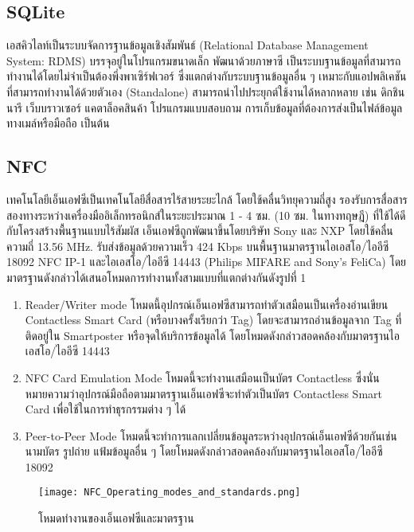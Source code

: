 \documentclass[a4paper]{article}
\begin{document}
\subsection{SQLite}
เอสคิวไลท์เป็นระบบจัดการฐานข้อมูลเชิงสัมพันธ์ (Relational Database Management System: RDMS) บรรจุอยู่ในโปรแกรมขนาดเล็ก พัฒนาด้วยภาษาซี เป็นระบบฐานข้อมูลที่สามารถทำงานได้โดยไม่จำเป็นต้องพึ่งพาเซิร์ฟเวอร์ ซึ่งแตกต่างกับระบบฐานข้อมูลอื่น ๆ เหมาะกับแอปพลิเคชันที่สามารถทำงานได้ด้วยตัวเอง (Standalone) สามารถนำไปประยุกต์ใช้งานได้หลากหลาย เช่น ดิกชินนารี เว็บบราวเซอร์ แคตาล็อคสินค้า โปรแกรมแบบสอบถาม การเก็บข้อมูลที่ต้องการส่งเป็นไฟล์ข้อมูลทางเมล์หรือมือถือ เป็นต้น

\subsection{NFC}
เทคโนโลยีเอ็นเอฟซีเป็นเทคโนโลยีสื่อสารไร้สายระยะไกล้ โดยใช้คลื่นวิทยุความถี่สูง รองรับการสื่อสารสองทางระหว่างเครื่องมืออิเล็กทรอนิกส์ในระยะประมาณ 1 - 4 ซม. (10 ซม. ในทางทฤษฎี) ที่ใช้ได้ดีกับโครงสร้างพื้นฐานแบบไร้สัมผัส เอ็นเอฟซีถูกพัฒนาขึ้นโดยบริษัท Sony และ NXP โดยใช้คลื่นความถี่ 13.56 MHz. รับส่งข้อมูลด้วยความเร็ว 424 Kbps บนพื้นฐานมาตรฐานไอเอสโอ/ไออีซี 18092 NFC IP-1 และไอเอสโอ/ไออีซี 14443 (Philips MIFARE and Sony’s FeliCa) โดยมาตรฐานดังกล่าวได้เสนอโหมดการทำงานทั้งสามแบบที่แตกต่างกันดังรูปที่ 1 

\begin{enumerate}
  \item Reader/Writer mode โหมดนี้อุปกรณ์เอ็นเอฟซีสามารถทำตัวเสมือนเป็นเครื่องอ่านเขียน Contactless Smart Card (หรือบางครั้งเรียกว่า Tag) โดยจะสามารถอ่านข้อมูลจาก Tag ที่ติดอยู่ใน Smartposter หรือจุดให้บริการข้อมูลได้ โดยโหมดดังกล่าวสอดคล้องกับมาตรฐานไอเอสโอ/ไออีซี 14443
  \item  NFC Card Emulation Mode โหมดนี้จะทำงานเสมือนเป็นบัตร Contactless ซึ่งนั่นหมายความว่าอุปกรณ์มือถือตามมาตรฐานเอ็นเอฟซีจะทำตัวเป็นบัตร Contactless Smart Card เพื่อใช้ในการทำธุรกรรมต่าง ๆ ได้
  \item Peer-to-Peer Mode โหมดนี้จะทำการแลกเปลี่ยนข้อมูลระหว่างอุปกรณ์เอ็นเอฟซีด้วยกันเช่นนามบัตร รูปถ่าย แฟ้มข้อมูลอื่น ๆ โดยโหมดดังกล่าวสอดคล้องกับมาตรฐานไอเอสโอ/ไออีซี 18092
\end{enumerate}

\begin{figure}[ht!]
\centering
\texttt{[image: NFC\_Operating\_modes\_and\_standards.png]}
\caption{โหมดทำงานของเอ็นเอฟซีและมาตรฐาน}
\label{overflow}
\end{figure}
\end{document}
